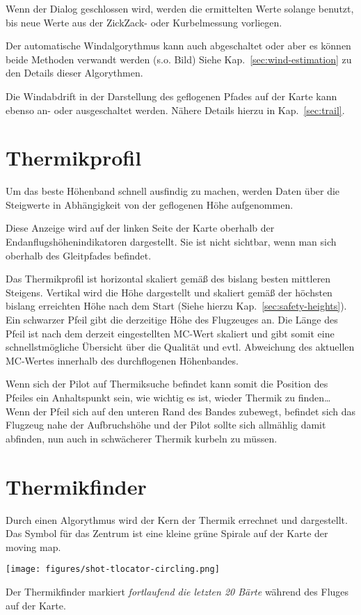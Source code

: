 Wenn der Dialog geschlossen wird, werden die ermittelten Werte solange benutzt,
 bis neue Werte aus der ZickZack- oder Kurbelmessung vorliegen.

Der automatische Windalgorythmus kann auch abgeschaltet oder aber es können
beide Methoden verwandt werden (s.o. Bild) Siehe Kap.~\ref{sec:wind-estimation}
zu den Details dieser Algorythmen.

Die Windabdrift in der Darstellung des geflogenen Pfades  auf der Karte kann ebenso an-
oder ausgeschaltet werden. Nähere Details hierzu in Kap.~\ref{sec:trail}.
\section{Thermikprofil}
Um das beste Höhenband schnell ausfindig zu machen, werden Daten über die Steigwerte in
Abhängigkeit von der geflogenen Höhe aufgenommen.

Diese Anzeige wird auf der linken Seite der Karte oberhalb der Endanflugshöhenindikatoren dargestellt.
Sie ist nicht sichtbar, wenn man sich oberhalb des Gleitpfades befindet.


Das Thermikprofil ist horizontal skaliert gemäß des bislang besten mittleren Steigens.
Vertikal wird die Höhe dargestellt und skaliert gemäß der höchsten bislang erreichten Höhe nach dem Start
(Siehe hierzu Kap.~\ref{sec:safety-heights}). Ein schwarzer Pfeil gibt die derzeitige Höhe des Flugzeuges an.
Die Länge des  Pfeil ist nach dem derzeit eingestellten MC-Wert skaliert und gibt somit eine schnellstmögliche
Übersicht über die Qualität und evtl. Abweichung des aktuellen MC-Wertes innerhalb des durchflogenen Höhenbandes.

Wenn sich der Pilot auf Thermiksuche befindet kann somit die Position des Pfeiles ein Anhaltspunkt sein,
wie wichtig es ist, wieder Thermik zu finden\dots
Wenn der Pfeil sich auf den unteren Rand des Bandes zubewegt, befindet sich das Flugzeug nahe der
Aufbruchshöhe und der Pilot sollte sich allmählig damit abfinden, nun auch in schwächerer Thermik kurbeln zu müssen.
\section{Thermikfinder}
Durch einen Algorythmus wird der Kern der Thermik errechnet und dargestellt.
Das Symbol für das Zentrum ist eine kleine grüne Spirale auf der Karte der moving map.
\begin{center}
\texttt{[image: figures/shot-tlocator-circling.png]}
\end{center}
Der Thermikfinder markiert \textit{fortlaufend  die letzten 20 Bärte} während des Fluges auf der Karte.

